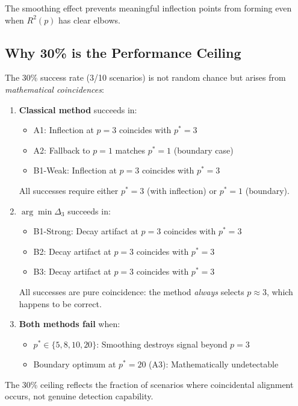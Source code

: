 \documentclass[11pt,a4paper]{article}
\begin{document}
The smoothing effect prevents meaningful inflection points from forming even when $R^2(p)$ has clear elbows.

\subsection{Why 30\% is the Performance Ceiling}

The 30\% success rate (3/10 scenarios) is not random chance but arises from \emph{mathematical coincidences}:

\begin{enumerate}
\item \textbf{Classical method} succeeds in:
\begin{itemize}
\item A1: Inflection at $p = 3$ coincides with $p^* = 3$ \checkmark
\item A2: Fallback to $p = 1$ matches $p^* = 1$ (boundary case) \checkmark
\item B1-Weak: Inflection at $p = 3$ coincides with $p^* = 3$ \checkmark
\end{itemize}
All successes require either $p^* = 3$ (with inflection) or $p^* = 1$ (boundary).

\item \textbf{$\arg\min \Delta_3$} succeeds in:
\begin{itemize}
\item B1-Strong: Decay artifact at $p = 3$ coincides with $p^* = 3$ \checkmark
\item B2: Decay artifact at $p = 3$ coincides with $p^* = 3$ \checkmark
\item B3: Decay artifact at $p = 3$ coincides with $p^* = 3$ \checkmark
\end{itemize}
All successes are pure coincidence: the method \emph{always} selects $p \approx 3$, which happens to be correct.

\item \textbf{Both methods fail} when:
\begin{itemize}
\item $p^* \in \{5, 8, 10, 20\}$: Smoothing destroys signal beyond $p = 3$
\item Boundary optimum at $p^* = 20$ (A3): Mathematically undetectable
\end{itemize}
\end{enumerate}

The 30\% ceiling reflects the fraction of scenarios where coincidental alignment occurs, not genuine detection capability.
\end{document}
